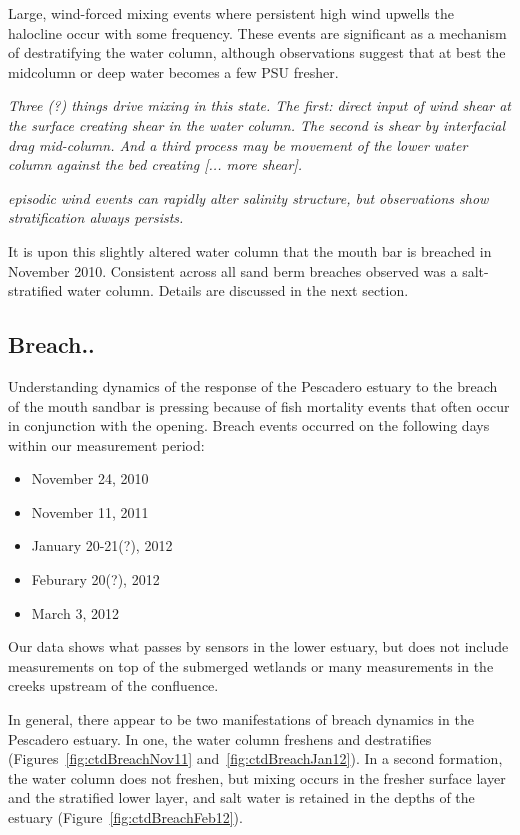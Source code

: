 Large, wind-forced mixing events where persistent high wind upwells the halocline occur with some frequency. These events are significant as a mechanism of destratifying the water column, although observations suggest that at best the midcolumn or deep water becomes a few PSU fresher. 


\emph{Three (?) things drive mixing in this state. The first: direct input of wind shear at the surface creating shear in the water column.  The second is shear by interfacial drag mid-column. And a third process may be movement of the lower water column against the bed creating [... more shear].}


\emph{episodic wind events can rapidly alter salinity structure, but observations show stratification always persists.}


It is upon this slightly altered water column that the mouth bar is breached in November 2010. Consistent across all sand berm breaches observed was a salt-stratified water column. Details are discussed in the next section. 

\subsection{Breach.. } \label{breach_dynamics}
Understanding dynamics of the response of the Pescadero estuary to the breach of the mouth sandbar is pressing because of fish mortality events that often occur in conjunction with the opening. Breach events occurred on the following days within our measurement period:
\begin{itemize}
	\item November 24, 2010
	\item November 11, 2011
	\item January 20-21(?), 2012
	\item Feburary 20(?), 2012
	\item March 3, 2012
\end{itemize}

Our data shows what passes by sensors in the lower estuary, but does not include measurements on top of the submerged wetlands or many measurements in the creeks upstream of the confluence.

In general, there appear to be two manifestations of breach dynamics in the Pescadero estuary.  In one, the water column freshens and destratifies (Figures~\ref{fig:ctdBreachNov11} and~\ref{fig:ctdBreachJan12}). In a second formation, the water column does not freshen, but mixing occurs in the fresher surface layer and the stratified lower layer, and salt water is retained in the depths of the estuary (Figure~\ref{fig:ctdBreachFeb12}). 

